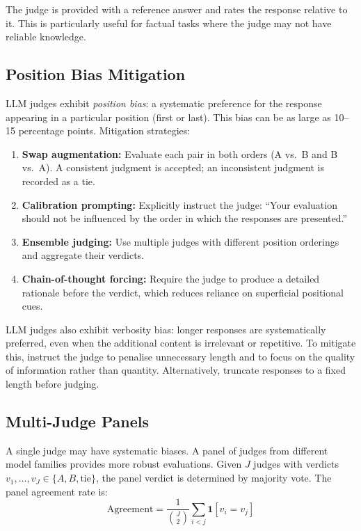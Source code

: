 The judge is provided with a reference answer and rates the response relative to it. This is particularly useful for factual tasks where the judge may not have reliable knowledge.

\subsection{Position Bias Mitigation}
\label{position-bias-mitigation}

LLM judges exhibit \emph{position bias}: a systematic preference for the response appearing in a particular position (first or last). This bias can be as large as 10--15 percentage points. Mitigation strategies:

\begin{enumerate}
  \item \textbf{Swap augmentation:} Evaluate each pair in both orders (A vs.~B and B vs.~A). A consistent judgment is accepted; an inconsistent judgment is recorded as a tie.
  \item \textbf{Calibration prompting:} Explicitly instruct the judge: ``Your evaluation should not be influenced by the order in which the responses are presented.''
  \item \textbf{Ensemble judging:} Use multiple judges with different position orderings and aggregate their verdicts.
  \item \textbf{Chain-of-thought forcing:} Require the judge to produce a detailed rationale before the verdict, which reduces reliance on superficial positional cues.
\end{enumerate}

\begin{warningbox}
LLM judges also exhibit verbosity bias: longer responses are systematically preferred, even when the additional content is irrelevant or repetitive. To mitigate this, instruct the judge to penalise unnecessary length and to focus on the quality of information rather than quantity. Alternatively, truncate responses to a fixed length before judging.
\end{warningbox}

\subsection{Multi-Judge Panels}
\label{multi-judge-panels}

A single judge may have systematic biases. A panel of judges from different model families provides more robust evaluations. Given $J$ judges with verdicts $v_1, \ldots, v_J \in \{A, B, \text{tie}\}$, the panel verdict is determined by majority vote. The panel agreement rate is: 
\begin{equation}
    \text{Agreement} = \frac{1}{\binom{J}{2}} \sum_{i < j} \mathbf{1}[v_i = v_j]
\end{equation}

